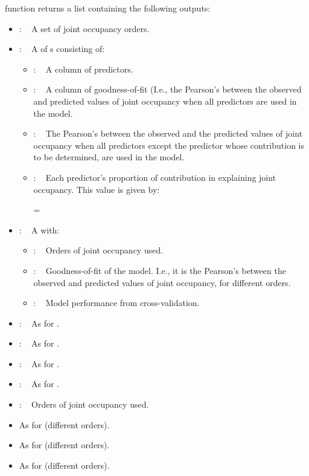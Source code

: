 \documentclass[a4paper]{book}
\begin{document}
%
\begin{Value}
 function returns a list containing the following outputs:
\begin{itemize}

\item{} :   A set of joint occupancy orders.
\item{} :   A  of s consisting of:
\begin{itemize}

\item{} :   A column of predictors.
\item{} :   A column of goodness-of-fit (I.e., the Pearson's 
between the observed and predicted values of joint occupancy when all predictors
are used in the model.
\item{} :   The Pearson's  between the observed and the
predicted values of joint occupancy when all predictors except the predictor
whose contribution is to be determined, are used in the model.
\item{} :   Each predictor's proportion of contribution in
explaining joint occupancy. This value is given by:

 = 

\end{itemize}

\item{} :   A  with:
\begin{itemize}

\item{} :   Orders of joint occupancy used.
\item{} :   Goodness-of-fit of the model. I.e., it is the
Pearson's  between the observed and predicted values of
joint occupancy, for different orders.
\item{} :   Model performance from cross-validation.

\end{itemize}

\item{} :   As for .
\item{} :   As for .
\item{} :   As for .
\item{} :   As for .
\item{} :   Orders of joint occupancy used.
\item{}  As for  (different orders).
\item{}  As for  (different orders).
\item{}  As for  (different orders).

\end{itemize}

\end{Value}
\end{document}
